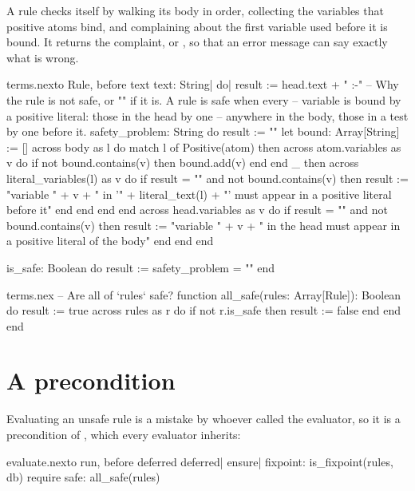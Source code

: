A rule checks itself by walking its body in order, collecting the variables
that positive atoms bind, and complaining about the first variable used
before it is bound. It returns the complaint, or , so that an error
message can say exactly what is wrong.

\begin{addbefore}{terms.nex}{to Rule, before text}{  text: String|  do|    result := head.text + " :-"}
  -- Why the rule is not safe, or "" if it is. A rule is safe when every
  -- variable is bound by a positive literal: those in the head by one
  -- anywhere in the body, those in a test by one before it.
  safety_problem: String
  do
    result := ""
    let bound: Array[String] := []
    across body as l do
      match l of
        Positive(atom) then
          across atom.variables as v do
            if not bound.contains(v) then
              bound.add(v)
            end
          end
        _ then
          across literal_variables(l) as v do
            if result = "" and not bound.contains(v) then
              result := "variable " + v + " in '" + literal_text(l)
                        + "' must appear in a positive literal before it"
            end
          end
      end
    end
    across head.variables as v do
      if result = "" and not bound.contains(v) then
        result := "variable " + v + " in the head must appear in a positive literal of the body"
      end
    end
  end

  is_safe: Boolean
  do
    result := safety_problem = ""
  end
\end{addbefore}

\begin{append}{terms.nex}
-- Are all of `rules` safe?
function all_safe(rules: Array[Rule]): Boolean
do
  result := true
  across rules as r do
    if not r.is_safe then
      result := false
    end
  end
end
\end{append}

\section{A precondition}

Evaluating an unsafe rule is a mistake by whoever called the evaluator, so
it is a precondition of , which every evaluator inherits:

\begin{tightaddbefore}{evaluate.nex}{to run, before deferred}{  deferred|  ensure|    fixpoint: is_fixpoint(rules, db)}
  require
    safe: all_safe(rules)
\end{tightaddbefore}

